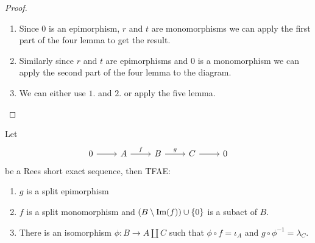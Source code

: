 \begin{proof}[Proof]
    \begin{enumerate}
        \item Since $0$ is an epimorphism, $r$ and $t$ are monomorphisms we can apply the first part of the four lemma 
        to get the result.
        \item Similarly since $r$ and $t$ are epimorphisms and $0$ is a monomorphism we can apply the second part of the four lemma to the diagram.
        \item We can either use $1.$ and $2.$ or apply the five lemma.
    \end{enumerate}
\end{proof}

\begin{proposition}
    Let 
    \[\begin{tikzcd}
        0 & A & B & C & 0
        \arrow[from=1-1, to=1-2]
        \arrow["f", from=1-2, to=1-3]
        \arrow["g", from=1-3, to=1-4]
        \arrow[from=1-4, to=1-5]
    \end{tikzcd}\]
    be a Rees short exact sequence, then TFAE:
    \begin{enumerate}
        \item $g$ is a split epimorphism
        \item $f$ is a split monomorphism and $(B\setminus\mathrm{Im}(f))\cup\{0\}$ is a subact of $B$.
        \item There is an isomorphism $\phi: B\to  A\coprod C$ such that $\phi\circ f=\iota_A$ and 
        $g\circ\phi^{-1}=\lambda_C$.
    \end{enumerate}
\end{proposition}
